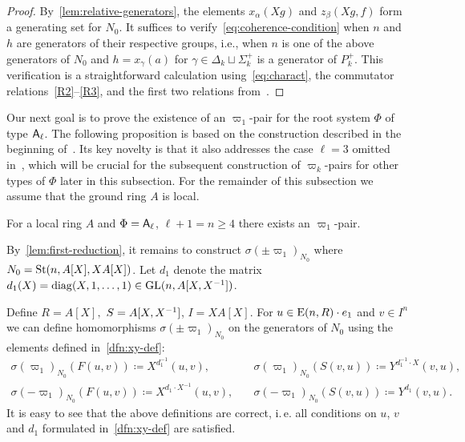 \begin{proof}
    By~\cref{lem:relative-generators}, the elements $x_\alpha(Xg)$ and $z_\beta(Xg, f)$ form a generating set for \( N_0 \).
    It suffices to verify~\eqref{eq:coherence-condition} when \( n \) and \( h \) are generators of their respective groups,
     i.e., when \( n \) is one of the above generators of \( N_0 \) and \( h = x_\gamma(a) \) for \( \gamma \in \Delta_k \sqcup \Sigma^+_k \) is a generator of \( P_k^+ \).
    This verification is a straightforward calculation using~\eqref{eq:charact}, the commutator relations~\eqref{R2}--\eqref{R3}, and the first two relations from~\cite[Lemma~9]{S15}.
\end{proof}

Our next goal is to prove the existence of an $\varpi_1$-pair for the root system $\Phi$ of type $\mathsf{A}_\ell$.
The following proposition is based on the construction described in the beginning of~\cite[\S~3]{Tu83}.
Its key novelty is that it also addresses the case \( \ell = 3 \) omitted in~\cite{Tu83}, which will be crucial for the subsequent construction of \( \varpi_k \)-pairs for other types of \( \Phi \) later in this subsection.
For the remainder of this subsection we assume that the ground ring $A$ is local.

\begin{prop} \label{prop:sigma-construction}
    For a local ring $A$ and $\Phi = \mathsf{A}_\ell$, $\ell + 1 = n \geq 4$ there exists an $\varpi_1$-pair.
\end{prop}

By~\eqref{lem:first-reduction}, it remains to construct $\sigma(\pm\varpi_1)_{N_0}$ where $N_0 = \operatorname{St}(n, A[X], XA[X])$.
Let \( d_1 \) denote the matrix $d_1(X) = \mathrm{diag}(X, 1, \ldots, 1) \in \operatorname{GL}(n, A[X, X^{-1}])$.

Define $R = A[X],$ $S = A[X, X^{-1}]$, $I = XA[X].$
For $u \in \operatorname{E}(n, R) \cdot e_1$ and $v \in I^n$ we can define homomorphisms $\sigma(\pm\varpi_1)_{N_0}$ on the generators of $N_{0}$ using the elements defined in~\cref{dfn:xy-def}:
\begin{align}
    \sigma(\varpi_1)_{N_0} \left(F(u, v)\right) \coloneqq X^{d_1^{-1}}(u, v), & \quad \sigma(\varpi_1)_{N_0} \left(S(v, u)\right) \coloneqq Y^{d_1^{-1} \cdot X}(v, u), \label{eq:def-sigma-1} \\
    \sigma(-\varpi_1)_{N_0} \left(F(u, v)\right) \coloneqq X^{d_1 \cdot X^{-1}}(u, v),& \quad \sigma(-\varpi_1)_{N_0} \left(S(v, u)\right) \coloneqq Y^{d_1}(v, u). \label{eq:def-sigma-2}
\end{align}
It is easy to see that the above definitions are correct, i.\,e. all conditions on $u$, $v$ and $d_1$ formulated in~\cref{dfn:xy-def} are satisfied.

